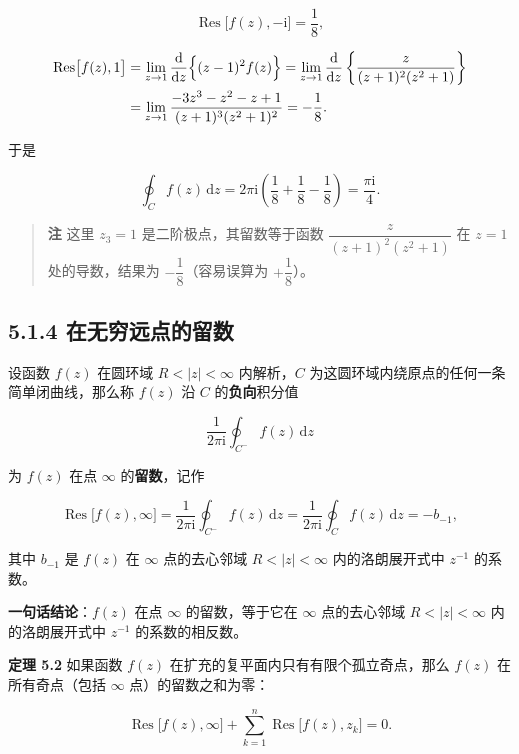 \[
\operatorname{Res}\bigl[f(z),-\mathrm i\bigr]=\frac{1}{8},
\]

\[
\begin{aligned}
\operatorname{Res}\bigl[f(z),1\bigr]
&=\lim_{z\to1}\frac{\mathrm d}{\mathrm dz}\Bigl\{(z-1)^{2}f(z)\Bigr\}
=\lim_{z\to1}\frac{\mathrm d}{\mathrm dz}\left\{\frac{z}{(z+1)^{2}(z^{2}+1)}\right\}\\
&=\lim_{z\to1}\frac{-3z^{3}-z^{2}-z+1}{(z+1)^{3}(z^{2}+1)^{2}}
=-\frac{1}{8}.
\end{aligned}
\]

于是

\[
\oint_C f(z)\,\mathrm dz
=2\pi\mathrm i\left(\frac{1}{8}+\frac{1}{8}-\frac{1}{8}\right)
=\frac{\pi\mathrm i}{4}.
\]

\begin{quote}
\textbf{注} 这里 \(z_3=1\) 是二阶极点，其留数等于函数
\(\dfrac{z}{(z+1)^{2}(z^{2}+1)}\) 在 \(z=1\) 处的导数，结果为
\(-\dfrac18\)（容易误算为 \(+\dfrac18\)）。
\end{quote}

\subsection{5.1.4
在无穷远点的留数}\label{ux5728ux65e0ux7a77ux8fdcux70b9ux7684ux7559ux6570}

设函数 \(f(z)\) 在圆环域 \(R<|z|<\infty\) 内解析，\(C\)
为这圆环域内绕原点的任何一条简单闭曲线，那么称 \(f(z)\) 沿 \(C\)
的\textbf{负向}积分值

\[
\frac{1}{2\pi\mathrm i}\oint_{C^{-}}f(z)\,\mathrm dz
\]

为 \(f(z)\) 在点 \(\infty\) 的\textbf{留数}，记作

\[
\operatorname{Res}\bigl[f(z),\infty\bigr]
=\frac{1}{2\pi\mathrm i}\oint_{C^{-}}f(z)\,\mathrm dz
=\frac{1}{2\pi\mathrm i}\oint_{C}f(z)\,\mathrm dz
=-b_{-1},
\]

其中 \(b_{-1}\) 是 \(f(z)\) 在 \(\infty\) 点的去心邻域 \(R<|z|<\infty\)
内的洛朗展开式中 \(z^{-1}\) 的系数。

\textbf{一句话结论}：\(f(z)\) 在点 \(\infty\) 的留数，等于它在
\(\infty\) 点的去心邻域 \(R<|z|<\infty\) 内的洛朗展开式中 \(z^{-1}\)
的系数的相反数。

\textbf{定理 5.2} 如果函数 \(f(z)\)
在扩充的复平面内只有有限个孤立奇点，那么 \(f(z)\) 在所有奇点（包括
\(\infty\) 点）的留数之和为零：

\[
\operatorname{Res}\bigl[f(z),\infty\bigr]+\sum_{k=1}^{n}\operatorname{Res}\bigl[f(z),z_k\bigr]=0 .
\]

